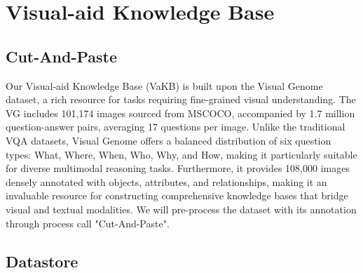 

\section{Visual-aid Knowledge Base}

\subsection{Cut-And-Paste}


Our Visual-aid Knowledge Base (VaKB) is built upon the Visual Genome dataset, a rich resource for tasks requiring fine-grained visual understanding. The VG includes 101,174 images sourced from MSCOCO, accompanied by 1.7 million question-answer pairs, averaging 17 questions per image. Unlike the traditional VQA datasets, Visual Genome offers a balanced distribution of six question types: What, Where, When, Who, Why, and How, making it particularly suitable for diverse multimodal reasoning tasks. Furthermore, it provides 108,000 images densely annotated with objects, attributes, and relationships, making it an invaluable resource for constructing comprehensive knowledge bases that bridge visual and textual modalities. We will pre-process the dataset with its annotation through process call "Cut-And-Paste". 








\subsection{Datastore}


